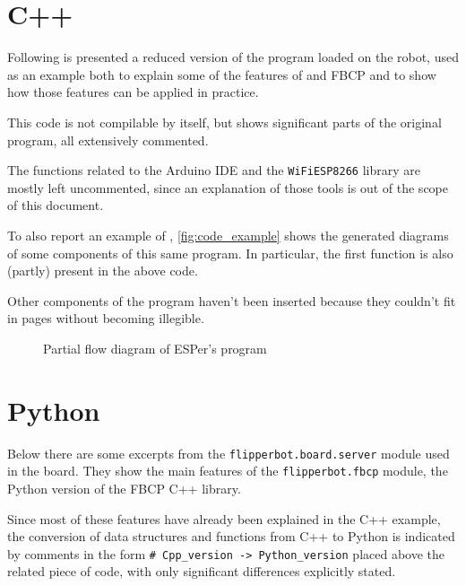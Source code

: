 \section{C++}
Following is presented a reduced version of the program loaded on the robot,
used as an example both to explain some of the features of \ScheMo{} and FBCP and
to show how those features can be applied in practice.

This code is not compilable by itself, but shows significant parts of the
original program, all extensively commented.

The functions related to the Arduino IDE and the \Verb|WiFiESP8266| library are
mostly left uncommented, since an explanation of those tools is out of the scope
of this document.



To also report an example of \ScheMoTeX{}, \autoref{fig:code_example} shows the
generated diagrams of some components of this same program. In particular,
the first function is also (partly) present in the above code.

Other components of the program haven't been inserted because they couldn't fit
in pages without becoming illegible.

\begin{figure}[hp]
  
  \caption{Partial flow diagram of ESPer's program}
  \label{fig:code_example}
\end{figure}

\section{Python}
Below there are some excerpts from the \Verb|flipperbot.board.server| module
used in the board. They show the main features of the \Verb|flipperbot.fbcp|
module, the Python version of the FBCP C++ library.

Since most of these features have already been explained in the C++ example,
the conversion of data structures and functions from C++ to Python is indicated
by comments in the form \Verb|# Cpp_version -> Python_version| placed above the
related piece of code, with only significant differences explicitly stated.



